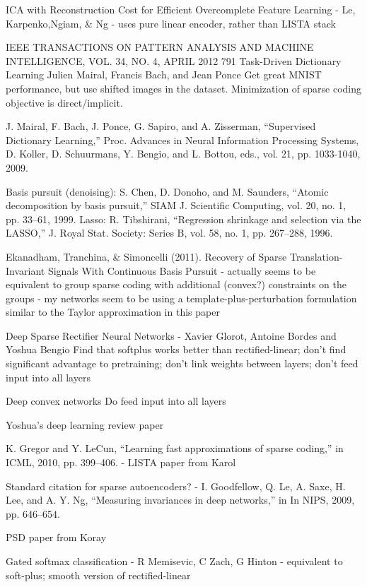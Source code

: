 ICA with Reconstruction Cost for Efficient Overcomplete Feature Learning - Le, Karpenko,Ngiam, \& Ng - uses pure linear encoder, rather than LISTA stack

IEEE TRANSACTIONS ON PATTERN ANALYSIS AND MACHINE INTELLIGENCE, VOL. 34, NO. 4, APRIL 2012 791
Task-Driven Dictionary Learning Julien Mairal, Francis Bach, and Jean Ponce
Get great MNIST performance, but use shifted images in the dataset.  Minimization of sparse coding objective is direct/implicit.

J. Mairal, F. Bach, J. Ponce, G. Sapiro, and A. Zisserman, “Supervised Dictionary Learning,” Proc. Advances in Neural Information Processing Systems, D. Koller, D. Schuurmans, Y. Bengio, and L. Bottou, eds., vol. 21, pp. 1033-1040, 2009.

Basis pursuit (denoising): S. Chen, D. Donoho, and M. Saunders, “Atomic decomposition by basis pursuit,” SIAM J. Scientific Computing, vol. 20, no. 1, pp. 33–61, 1999.
Lasso: R. Tibshirani, “Regression shrinkage and selection via the LASSO,” J. Royal Stat. Society: Series B, vol. 58, no. 1, pp. 267–288, 1996.

Ekanadham, Tranchina, \& Simoncelli (2011). Recovery of Sparse Translation-Invariant Signals With Continuous Basis Pursuit  - actually seems to be equivalent to group sparse coding with additional (convex?) constraints on the groups - my networks seem to be using a template-plus-perturbation formulation similar to the Taylor approximation in this paper



Deep Sparse Rectifier Neural Networks - Xavier Glorot, Antoine Bordes and Yoshua Bengio
Find that softplus works better than rectified-linear; don't find significant advantage to pretraining; don't link weights between layers; don't feed input into all layers

Deep convex networks
Do feed input into all layers

Yoshua's deep learning review paper

K. Gregor and Y. LeCun, “Learning fast approximations of sparse coding,” in ICML, 2010, pp. 399–406. - LISTA paper from Karol

Standard citation for sparse autoencoders? - I. Goodfellow, Q. Le, A. Saxe, H. Lee, and A. Y. Ng, “Measuring invariances in deep networks,” in In NIPS, 2009, pp. 646–654.

PSD paper from Koray

Gated softmax classification - R Memisevic, C Zach, G Hinton - equivalent to soft-plus; smooth version of rectified-linear

